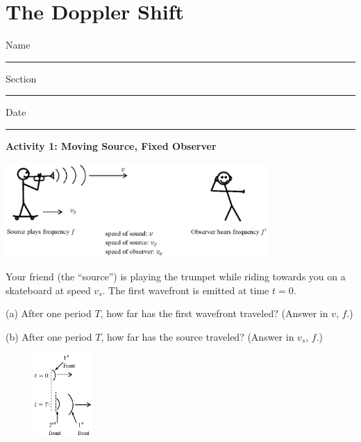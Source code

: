 \section{The Doppler Shift}

Name \rule{2.0in}{0.1pt}\hfill{}Section \rule{1.0in}{0.1pt}\hfill{}Date
\rule{1.0in}{0.1pt}

\vspace{0.1in}
%

\textbf{Activity 1: Moving Source, Fixed Observer}

\begin{center}
\includegraphics[width=0.75\textwidth]{doppler_shift/moving_source.eps}
\end{center}

Your friend (the ``source'') is playing the trumpet while riding towards you on a skateboard at speed $v_s$.  The first wavefront is emitted at time $t=0$.

(a) After one period $T$, how far has the first wavefront traveled?  (Answer in $v$, $f$.)
\vspace{1.0in}

(b) After one period $T$, how far has the source traveled? (Answer in $v_s$, $f$.)
\vspace{1.0in}

\begin{figure}
    \vspace{-0.9 in}
\includegraphics[width=0.2\textwidth]{doppler_shift/front_motion.eps}
\end{figure}

